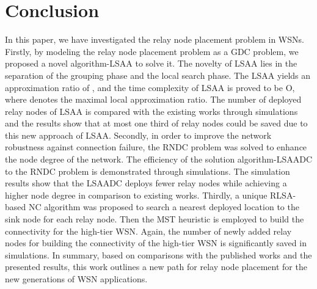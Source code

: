 \documentclass[journal]{IEEEtran}
\begin{document}
\section{Conclusion}
In this paper, we have investigated the relay node placement problem in WSNs. Firstly, by modeling the relay node placement problem as a GDC problem, we proposed a novel algorithm-LSAA to solve it. The novelty of LSAA lies in the separation of the grouping phase and the local search phase. The LSAA yields an approximation ratio of , and the time complexity of LSAA is proved to be O, where  denotes the maximal local approximation ratio. The number of deployed relay nodes of LSAA is compared with the existing works through simulations and the results show that at most one third of relay nodes could be saved due to this new approach of LSAA. Secondly, in order to improve the network robustness against connection failure, the RNDC problem was solved to enhance the node degree of the network. The efficiency of the solution algorithm-LSAADC to the RNDC problem is demonstrated through simulations. The simulation results show that the LSAADC deploys fewer relay nodes while achieving a higher node degree in comparison to existing works. Thirdly, a unique RLSA-based NC algorithm was proposed to search a nearest deployed location to the sink node for each relay node. Then the MST heuristic is employed to build the connectivity for the high-tier WSN. Again, the number of newly added relay nodes for building the connectivity of the high-tier WSN is significantly saved in simulations. In summary, based on comparisons with the published works and the presented results, this work outlines a new path for relay node placement for the new generations of WSN applications.









\appendices





\ifCLASSOPTIONcaptionsoff
  \newpage
\fi
\end{document}
